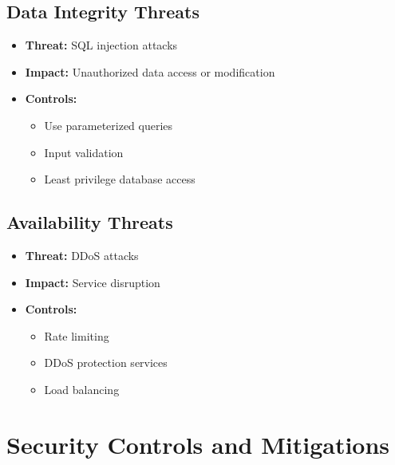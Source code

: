 \documentclass{article}
\begin{document}
\subsection{Data Integrity Threats}
\begin{itemize}
    \item \textbf{Threat:} SQL injection attacks
    \item \textbf{Impact:} Unauthorized data access or modification
    \item \textbf{Controls:}
    \begin{itemize}
        \item Use parameterized queries
        \item Input validation
        \item Least privilege database access
    \end{itemize}
\end{itemize}

\subsection{Availability Threats}
\begin{itemize}
    \item \textbf{Threat:} DDoS attacks
    \item \textbf{Impact:} Service disruption
    \item \textbf{Controls:}
    \begin{itemize}
        \item Rate limiting
        \item DDoS protection services
        \item Load balancing
    \end{itemize}
\end{itemize}

\section{Security Controls and Mitigations}
\end{document}

